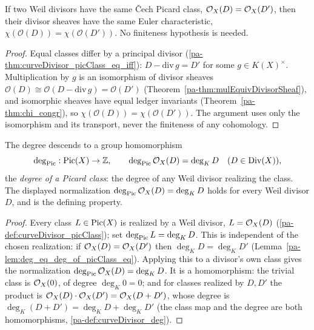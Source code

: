 \begin{theorem}
  \label{pa-thm:chi_divisorSheaf_eq_of_picClass_eq}
  \leanok

  If two Weil divisors have the same \v Cech Picard class, \(\mathcal{O}_{X}(D) = \mathcal{O}_{X}(D')\), then
  their divisor sheaves have the same Euler characteristic, \(\chi(\mathcal O(D)) = \chi(\mathcal
  O(D'))\). No finiteness hypothesis is needed.
\end{theorem}
\begin{proof}
  \leanok
  Equal classes differ by a principal divisor (\ref{pa-thm:curveDivisor_picClass_eq_iff}): \(D -
  \mathrm{div}\, g = D'\) for some \(g \in K(X)^\times\). Multiplication by \(g\) is an isomorphism
  of divisor sheaves \(\mathcal O(D) \cong \mathcal O(D - \mathrm{div}\, g) = \mathcal O(D')\)
  (Theorem~\ref{pa-thm:mulEquivDivisorSheaf}), and isomorphic sheaves have equal ledger invariants
  (Theorem~\ref{pa-thm:chi_congr}), so \(\chi(\mathcal O(D)) = \chi(\mathcal O(D'))\). The argument
  uses only the isomorphism and its transport, never the finiteness of any cohomology.
\end{proof}

\begin{definition}
  \label{pa-def:classDeg}
  \leanok

  The degree descends to a group homomorphism
  \[
    \deg_{\operatorname{Pic}} : \operatorname{Pic}(X) \to \mathbb{Z}, \qquad \deg_{\operatorname{Pic}}\mathcal{O}_{X}(D) = \deg_K D
    \quad (D \in \operatorname{Div}(X)),
  \]
  the \emph{degree of a Picard class}: the degree of any Weil divisor realizing the class. The
  displayed normalization \(\deg_{\operatorname{Pic}}\mathcal{O}_{X}(D) = \deg_K D\) holds for every Weil divisor
  \(D\), and is the defining property.
\end{definition}
\begin{proof}
  \leanok
  Every class \(L \in \operatorname{Pic}(X)\) is realized by a Weil divisor, \(L = \mathcal{O}_{X}(D)\)
  (\ref{pa-def:curveDivisor_picClass}); set \(\deg_{\operatorname{Pic}} L = \deg_K D\). This is independent of the
  chosen realization: if \(\mathcal{O}_{X}(D) = \mathcal{O}_{X}(D')\) then \(\deg_K D = \deg_K D'\)
  (Lemma~\ref{pa-lem:deg_eq_deg_of_picClass_eq}). Applying this to a divisor's own class gives the
  normalization \(\deg_{\operatorname{Pic}}\mathcal{O}_{X}(D) = \deg_K D\). It is a homomorphism: the trivial class is
  \(\mathcal{O}_{X}(0)\), of degree \(\deg_K 0 = 0\); and for classes realized by \(D, D'\) the product
  is \(\mathcal{O}_{X}(D)\cdot\mathcal{O}_{X}(D') = \mathcal{O}_{X}(D + D')\), whose degree is \(\deg_K(D + D') =
  \deg_K D + \deg_K D'\) (the class map and the degree are both homomorphisms,
  \ref{pa-def:curveDivisor_deg}).
\end{proof}

